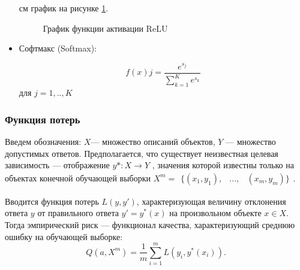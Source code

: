 \begin{itemize}[wide]
    см график на рисунке \ref{fig:relu}.
        \begin{figure} [ht]
            \centering
            \caption{График функции активации ReLU}
            \label{fig:relu}
        \end{figure}    
    \item Софтмакс (Softmax): 
    
    \begin{equation}
        f(x)j = \dfrac{e^{s_j}}{\sum^K_{k=1}e^{s_k}}
    \end{equation}
    для $j = 1, .., K$
\end{itemize}

    



\subsubsection{Функция потерь}
Введем обозначения: $X$— множество описаний объектов, $Y$ — множество допустимых ответов. Предполагается, что существует неизвестная целевая зависимость — отображение $y* : X \rightarrow Y$ , значения которой известны только на объектах конечной обучающей выборки 
$X^m = \begin{matrix}\{ (x_1, y_1), & ..., & (x_m, y_m)  \}\end{matrix}$.

Вводится функция потерь $L(y, y')$, характеризующая величину отклонения ответа $y$ от правильного ответа $y' = y^*(x)$ на произвольном объекте $x \in X$. Тогда эмпирический риск \cite{classification} — функционал качества, характеризующий среднюю ошибку на обучающей выборке:
\begin{equation}
    Q(a,X^m)= \dfrac{1}{m} \sum^m_{i=1} L(y_i,y^*(x_i)) .
\end{equation}


